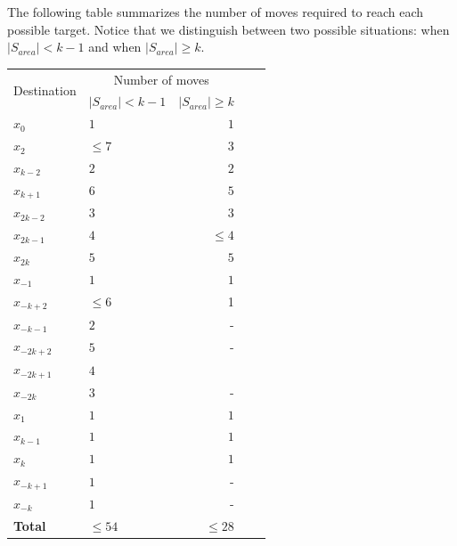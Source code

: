 The following table summarizes the number of moves required to reach each possible target. Notice that we distinguish between two possible situations: when $\left\vert{S_{area}}\right\vert < k-1$ and  when $\left\vert{S_{area}}\right\vert \ge k$.
\begin{center}
\begin{tabular}{|l|lr|lr|}\hline
\multirow{2}{1 in}{Destination} &
\multicolumn{2}{c|}{Number of moves}
\\
& $\left\vert{S_{area}}\right\vert < k-1$ & $\left\vert{S_{area}}\right\vert \ge k$ \\\hline\hline
$x_0$       & $1$ & $1$  \\\hline

$x_{2}$    & $\leq7$   & $3$     \\\hline
$x_{k-2}$    & $2$   & $2$     \\\hline
$x_{k+1}$ & $6$   & $5$         \\\hline
$x_{2k-2}$ & $3$   & $3$         \\\hline
$x_{2k-1}$ & $4$   & $\leq4$         \\\hline
$x_{2k}$ & $5$   & $5$         \\\hline

$x_{-1}$            & $ 1$   & $ 1$        \\\hline

$x_{-k+2}$    & $\leq6$   & 1     \\\hline

$x_{-k-1}$            & $2$   & -        \\\hline
$x_{-2k+2}$            & $5$   & -        \\\hline
$x_{-2k+1}$    & $4$   &     \\\hline

$x_{-2k}$ & $3$   & -        \\\hline

$x_1$       & $1$ & $1$  \\\hline
$x_{k-1}$       & $1$ & $1$  \\\hline
$x_k$       & $1$ & $1$  \\\hline
$x_{-k+1}$    & $1$   & -    \\\hline
$x_{-k}$       & $1$ & -  \\\hline
{\bf Total}     & $\leq 54$   & $\leq 28$ \\\hline
\end{tabular}
\end{center}




